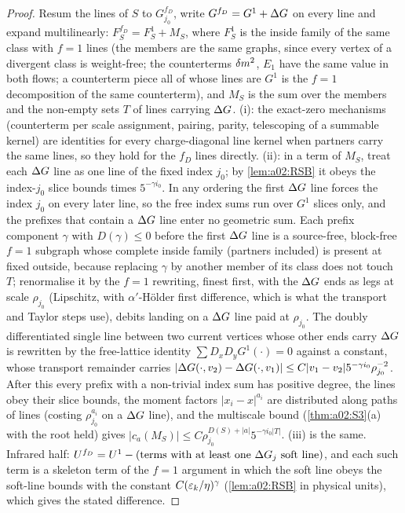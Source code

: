 \begin{proof}
Resum the lines of $S$ to $G^{f_D}_{j_0}$, write $G^{f_D}=G^1+\Delta G$ on every line and expand multilinearly: $F_S^{f_D}=F_S^1+M_S$, where $F^1_S$ is the inside family of the same class with $f=1$ lines (the members are the same graphs, since every vertex of a divergent class is weight-free; the counterterms $\delta m^2$, $E_1$ have the same value in both flows; a counterterm piece all of whose lines are $G^1$ is the $f=1$ decomposition of the same counterterm), and $M_S$ is the sum over the members and the non-empty sets $T$ of lines carrying $\Delta G$. (i): the exact-zero mechanisms (counterterm per scale assignment, pairing, parity, telescoping of a summable kernel) are identities for every charge-diagonal line kernel when partners carry the same lines, so they hold for the $f_D$ lines directly. (ii): in a term of $M_S$, treat each $\Delta G$ line as one line of the fixed index $j_0$; by \cref{lem:a02:RSB} it obeys the index-$j_0$ slice bounds times $5^{-\gamma i_0}$. In any ordering the first $\Delta G$ line forces the index $j_0$ on every later line, so the free index sums run over $G^1$ slices only, and the prefixes that contain a $\Delta G$ line enter no geometric sum. Each prefix component $\gamma$ with $D(\gamma)\le0$ before the first $\Delta G$ line is a source-free, block-free $f=1$ subgraph whose complete inside family (partners included) is present at fixed outside, because replacing $\gamma$ by another member of its class does not touch $T$; renormalise it by the $f=1$ rewriting, finest first, with the $\Delta G$ ends as legs at scale $\rho_{j_0}$ (Lipschitz, with $\alpha'$-H\"older first difference, which is what the transport and Taylor steps use), debits landing on a $\Delta G$ line paid at $\rho_{j_0}$. The doubly differentiated single line between two current vertices whose other ends carry $\Delta G$ is rewritten by the free-lattice identity $\sum D_xD_yG^1(\cdot)=0$ against a constant, whose transport remainder carries $|\Delta G(\cdot,v_2)-\Delta G(\cdot,v_1)|\le C|v_1-v_2|5^{-\gamma i_0}\rho_{j_0}^{-2}$. After this every prefix with a non-trivial index sum has positive degree, the lines obey their slice bounds, the moment factors $|x_i-x|^{a_i}$ are distributed along paths of lines (costing $\rho_{j_0}^{a_i}$ on a $\Delta G$ line), and the multiscale bound (\cref{thm:a02:S3}(a) with the root held) gives $|c_a(M_S)|\le C\rho_{j_0}^{D(S)+|a|}5^{-\gamma i_0|T|}$. (iii) is the same. Infrared half: $U^{f_D}=U^1-(\text{terms with at least one }\Delta G_j\text{ soft line})$, and each such term is a skeleton term of the $f=1$ argument in which the soft line obeys the soft-line bounds with the constant $C(\varepsilon_k/\eta)^\gamma$ (\cref{lem:a02:RSB} in physical units), which gives the stated difference.
\end{proof}



